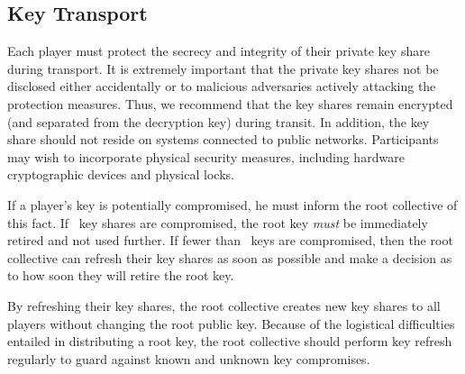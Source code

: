 \subsection{Key Transport}

Each player must protect the secrecy and integrity of their private
key share during transport. It is extremely important that the private
key shares not be disclosed either accidentally or to malicious
adversaries actively attacking the protection measures. Thus, we
recommend that the key shares remain encrypted (and separated from the
decryption key) during transit. In addition, the key share should not
reside on systems connected to public networks. Participants may wish
to incorporate physical security measures, including hardware
cryptographic devices and physical locks.

If a player's key is potentially compromised, he must inform the root
collective of this fact. If \nums\ key shares are compromised, the
root key {\it must} be immediately retired and not used further. If
fewer than \nums\ keys are compromised, then the root collective can
refresh their key shares as soon as possible and make a decision as to
how soon they will retire the root key.

By refreshing their key shares, the root collective creates new key
shares to all players without changing the root public key. Because of
the logistical difficulties entailed in distributing a root key, the
root collective should perform key refresh regularly to guard against
known and unknown key compromises.
